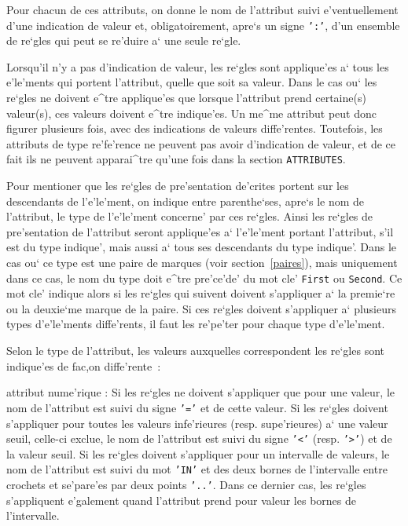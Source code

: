 {Pour chacun de ces attributs, on donne le nom de l'attribut suivi
e'ventuellement d'une indication de valeur et, obligatoirement, apre`s un
signe {\tt ':'}, d'un ensemble de re`gles qui peut se re'duire a` une seule
re`gle.

Lorsqu'il n'y a pas d'indication de valeur,
les re`gles sont applique'es a` tous les e'le'ments qui portent l'attribut,
quelle que soit sa valeur. Dans le cas ou` les re`gles ne doivent e^tre
applique'es que lorsque l'attribut prend certaine(s) valeur(s), ces valeurs
doivent e^tre indique'es. Un me^me attribut peut donc figurer plusieurs fois,
avec des indications de valeurs diffe'rentes. Toutefois, les attributs de type
re'fe'rence ne peuvent pas avoir d'indication de valeur, et de ce fait ils ne
peuvent apparai^tre qu'une fois dans la section {\tt ATTRIBUTES}.

Pour mentioner que les re`gles de pre'sentation de'crites portent sur
les descendants de l'e'le'ment, on
indique entre parenthe`ses, apre`s le nom de l'attribut, le type de
l'e'le'ment concerne' par ces re`gles. Ainsi les re`gles de
pre'sentation de l'attribut seront applique'es a` l'e'le'ment
portant l'attribut, s'il est du type indique', mais aussi a` tous ses descendants du type indique'.
Dans le cas ou` ce type est une paire de marques (voir section~\ref{paires}),
mais uniquement dans ce cas, le nom du type doit e^tre pre'ce'de' du mot cle'
{\tt First} ou {\tt Second}. Ce mot cle' indique alors si les re`gles qui
suivent doivent s'appliquer a` la premie`re ou la deuxie`me marque de la paire.
Si ces re`gles doivent s'appliquer a` plusieurs types d'e'le'ments
diffe'rents, il faut les re'pe'ter pour chaque type d'e'le'ment.

Selon le type de l'attribut, les valeurs auxquelles correspondent les re`gles
sont indique'es de fac,on diffe'rente~:
\begin{description}
\item{attribut nume'rique :}
Si les re`gles ne doivent s'appliquer que pour une valeur, le nom de l'attribut
est suivi du signe {\tt '='} et de cette valeur.
Si les re`gles doivent s'appliquer pour toutes les valeurs infe'rieures (resp.
supe'rieures) a` une valeur seuil, celle-ci exclue, le nom de l'attribut est
suivi du signe {\tt '<'} (resp. {\tt '>'}) et de la valeur seuil.
Si les re`gles doivent s'appliquer pour un intervalle de valeurs, le nom de
l'attribut est suivi du mot {\tt 'IN'} et des deux bornes de l'intervalle
entre crochets et se'pare'es par deux points {\tt '..'}. Dans ce dernier
cas, les re`gles s'appliquent e'galement quand l'attribut prend pour
valeur les bornes de l'intervalle.


\end{description}}

